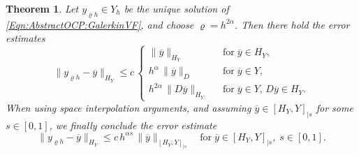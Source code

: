 \documentclass{article}
\newtheorem{theorem}{Theorem}
\numberwithin{equation}{section}
\begin{document}
\begin{theorem}
  Let $y_{\varrho h} \in Y_h$ be the unique solution of 
  \eqref{Eqn:AbstractOCP:GalerkinVF}, and choose
  $\varrho = h^{2\alpha}$. Then there hold the error estimates
  \begin{equation}\label{Eqn:AbstractOCP:Error target}
    \| y_{\varrho h} - \overline{y} \|_{H_Y} \leq c \, \left \{
      \begin{array}{ccl}
        \| \overline{y} \|_{H_Y}
        & & \mbox{for} \; \overline{y} \in H_Y, \\[2mm]
        h^\alpha \, \| \overline{y} \|_D
        & & \mbox{for} \; \overline{y} \in Y, \\[2mm]
        h^{2\alpha} \, \| D \overline{y} \|_{H_Y}
        && \mbox{for} \; \overline{y} \in Y, \, D \overline{y} \in H_Y .
      \end{array} \right.
  \end{equation}
  When using space interpolation arguments, and
  assuming $\overline{y} \in [H_Y,Y]_{|s}$ for some $s \in [0,1]$,
  we finally conclude the error estimate
  \begin{equation}\label{Eqn:AbstractOCP:Error Interpolation}
    \| y_{\varrho h} - \overline{y} \|_{H_Y} \leq c \, h^{\alpha s} \,
    \| \overline{y} \|_{[H_Y,Y]_{|s}} \quad
    \mbox{for} \; \overline{y} \in [H_Y,Y]_{|s} , \; s \in [0,1].
  \end{equation}
\end{theorem}
\end{document}
